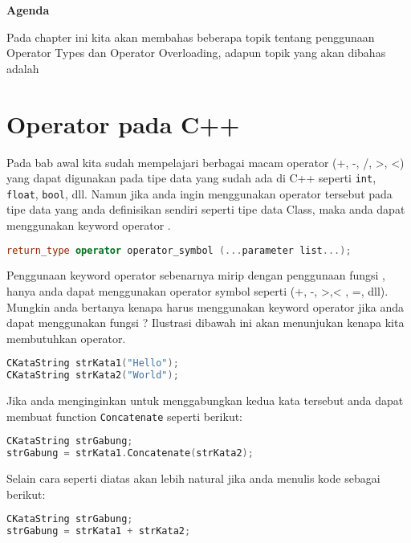 \textbf{Agenda}

Pada chapter ini kita akan membahas beberapa topik tentang penggunaan
Operator Types dan Operator Overloading, adapun topik yang akan dibahas
adalah

\minitoc

\section{Operator pada C++}\label{operator-pada-cpp}

Pada bab awal kita sudah mempelajari berbagai macam operator (+, -, /,
\textgreater{}, \textless{}) yang dapat digunakan pada tipe data yang
sudah ada di C++ seperti \texttt{int}, \texttt{float}, \texttt{bool},
dll. Namun jika anda ingin menggunakan operator tersebut pada tipe data
yang anda definisikan sendiri seperti tipe data Class, maka anda dapat
menggunakan keyword operator .

\begin{lstlisting}[language=c++, numbers=none]
return_type operator operator_symbol (...parameter list...);
\end{lstlisting}

Penggunaan keyword operator sebenarnya mirip dengan penggunaan fungsi ,
hanya anda dapat menggunakan operator symbol seperti (+, -,
\textgreater{},\textless{} , =, dll). Mungkin anda bertanya kenapa harus
menggunakan keyword operator jika anda dapat menggunakan fungsi ?
Ilustrasi dibawah ini akan menunjukan kenapa kita membutuhkan operator.

\begin{lstlisting}[language=c++, numbers=none]
CKataString strKata1("Hello");
CKataString strKata2("World");
\end{lstlisting}

Jika anda menginginkan untuk menggabungkan kedua kata tersebut anda
dapat membuat function \texttt{Concatenate} seperti berikut:

\begin{lstlisting}[language=c++, numbers=none]
CKataString strGabung;
strGabung = strKata1.Concatenate(strKata2);
\end{lstlisting}

Selain cara seperti diatas akan lebih natural jika anda menulis kode
sebagai berikut:

\begin{lstlisting}[language=c++, numbers=none]
CKataString strGabung;
strGabung = strKata1 + strKata2;
\end{lstlisting}

